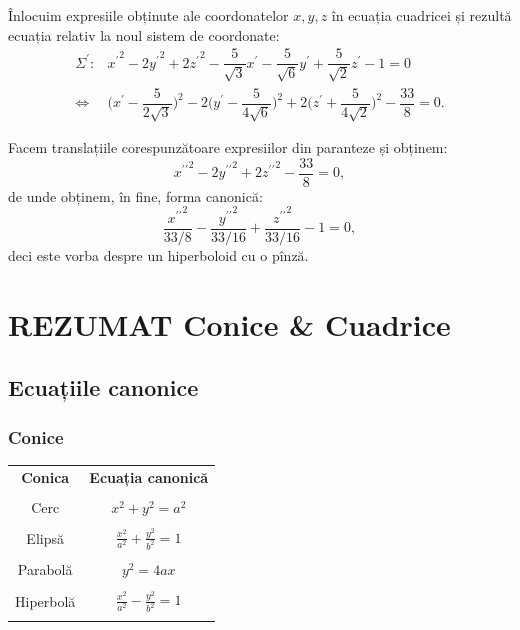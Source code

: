 Înlocuim expresiile obținute ale coordonatelor $x, y, z$ în ecuația cuadricei
și rezultă ecuația relativ la noul sistem de coordonate:
\begin{align*}
	\Sigma^{\prime} :& {x^{\prime}}^2 - 2{y^{\prime}}^2 + 2{z^{\prime}}^2 -
	                    \dfrac{5}{\sqrt{3}} x^{\prime} - 
	                    \dfrac{5}{\sqrt{6}} y^{\prime} +
	                    \dfrac{5}{\sqrt{2}} z^{\prime} - 1 = 0 \\
\Longleftrightarrow & \Big( x^{\prime} - \dfrac{5}{2 \sqrt{3}} \Big)^2 -
                     2 \Big( y^{\prime} - \dfrac{5}{4 \sqrt{6}} \Big)^2 + 
                     2 \Big( z^{\prime} + \dfrac{5}{4 \sqrt{2}} \Big)^2 -
                     \dfrac{33}{8} = 0.
\end{align*}

Facem translațiile corespunzătoare expresiilor din paranteze și obținem: 
 \[
	{x^{\prime\prime}}^2 - 2 {y^{\prime\prime}}^2 + 2{z^{\prime\prime}}^2 - 
	\dfrac{33}{8} = 0,
\]
de unde obținem, în fine, forma canonică: 
 \[
	\dfrac{{x^{\prime\prime}}^2}{33/8} -
	\dfrac{{y^{\prime\prime}}^2}{33/16} +
	\dfrac{{z^{\prime\prime}}^2}{33/16} - 1 = 0,
\]
deci este vorba despre un hiperboloid cu o pînză.



\section{REZUMAT Conice \& Cuadrice}
\label{sec:rez-conice-c}

\subsection{Ecuațiile canonice}
\label{sec:ec-canonice}

\subsubsection{Conice}
\label{subsec:conice}

\begin{center}
  \begin{tabular}{| c | c |}
    \hline
    \textbf{Conica} & \textbf{Ecuația canonică} \\ & \\
    Cerc & $x^2 + y^2 = a^2$ \\ & \\
    Elipsă & $\frac{x^2}{a^2} + \frac{y^2}{b^2} = 1$ \\ & \\
    Parabolă & $y^2 = 4ax$ \\ & \\
    Hiperbolă & $\frac{x^2}{a^2} - \frac{y^2}{b^2} = 1$ \\ & \\
    \hline
  \end{tabular}
\end{center}

